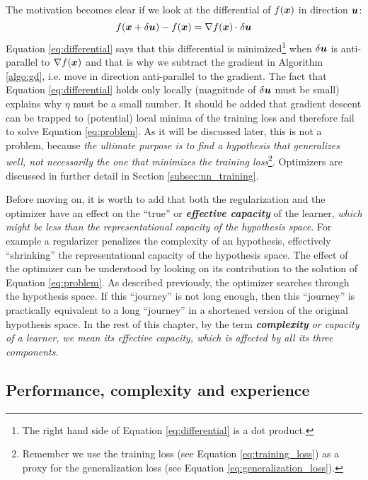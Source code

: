 The motivation becomes clear if we look at the differential of $f(\boldsymbol{x})$ in
direction $\boldsymbol{u}$: \begin{equation} \label{eq:differential} f(\boldsymbol{x} + \delta
\boldsymbol{u}) - f(\boldsymbol{x}) = \nabla f(\boldsymbol{x}) \cdot \delta \boldsymbol{u} \end{equation} Equation
\ref{eq:differential} says that this differential is minimized\footnote{The
right hand side of Equation \ref{eq:differential} is a dot product.} when
$\delta \boldsymbol{u}$ is anti-parallel to $\nabla f(\boldsymbol{x})$ and that is why we subtract
the gradient in Algorithm \ref{algo:gd}, i.e. move in direction anti-parallel to
the gradient. The fact that Equation \ref{eq:differential} holds only locally
(magnitude of $\delta \boldsymbol{u}$ must be small) explains why $\eta$ must be a small
number. It should be added that gradient descent can be trapped to (potential)
local minima of the training loss and therefore fail to solve Equation
\ref{eq:problem}. As it will be discussed later, this is not a problem, because
\emph{the ultimate purpose is to find a hypothesis that generalizes well, not
necessarily the one that minimizes the training loss}\footnote{Remember we use
the training loss (see Equation \ref{eq:training_loss}) as a proxy for the
generalization loss (see Equation \ref{eq:generalization_loss}).}. Optimizers
are discussed in further detail in Section \ref{subsec:nn_training}.

Before moving on, it is worth to add that both the regularization and the
optimizer have an effect on the ``true'' or \emph{\textbf{effective
capacity}} \parencite{deeplearning} of the learner,
\emph{which might be less than the representational
capacity of the hypothesis space}. For example
a regularizer penalizes the complexity of an hypothesis, effectively
``shrinking'' the representational capacity of the hypothesis space. The effect
of the optimizer can be understood by looking on its contribution to the
solution of Equation \ref{eq:problem}. As described previously, the optimizer
searches through the hypothesis space. If this ``journey'' is not long enough,
then this ``journey'' is practically equivalent to a long ``journey'' in a
shortened version of the original hypothesis space. In the rest of this chapter,
by the term \emph{\textbf{complexity} or
capacity of a learner, we mean its effective capacity, which is
affected by all its three components}.

\subsection{Performance, complexity and experience}

